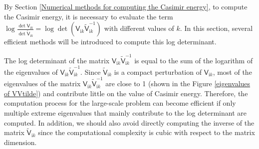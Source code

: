 By Section \ref{Numerical methods for computing the Casimir energy}, to compute the Casimir energy, it is necessary to evaluate the term
$\log\frac{\det\mathsf{V}_{\mathrm{i}k}}{\det\tilde{\mathsf{V}}_{\mathrm{i}k}} = \log\det(\mathsf{V}_{\mathrm{i}k}\tilde{\mathsf{V}}_{\mathrm{i}k}^{-1})$ 
with different values of $k$. In this section, several efficient methods will be introduced to compute this log determinant.

The log determinant of the matrix $\mathsf{V}_{\mathrm{i}k}\tilde{\mathsf{V}}_{\mathrm{i}k}^{-1}$ is equal to the sum of the logarithm of the eigenvalues of 
$\mathsf{V}_{\mathrm{i}k}\tilde{\mathsf{V}}_{\mathrm{i}k}^{-1}$. Since $\tilde{\mathsf{V}}_{\mathrm{i}k}$ is a compact perturbation of $\mathsf{V}_{\mathrm{i}k}$,
most of the eigenvalues of the matrix $\mathsf{V}_{\mathrm{i}k}\tilde{\mathsf{V}}_{\mathrm{i}k}^{-1}$ are close to 1 
(shown in the Figure \ref{eigenvalues of VVtilde}) and contribute little on the value of Casimir energy.
Therefore, the computation process for the large-scale problem can become efficient if only multiple extreme eigenvalues 
that mainly contribute to the log determinant are computed. In addition, we should also avoid directly computing the inverse of the matrix $\tilde{\mathsf{V}}_{\mathrm{i}k}$
since the computational complexity is cubic with respect to the matrix dimension.

